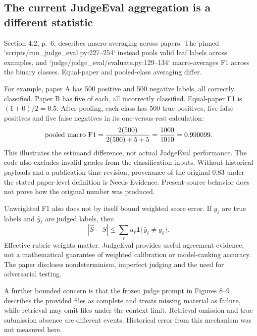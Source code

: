 \documentclass[10pt]{article}
\begin{document}
\subsection*{The current JudgeEval aggregation is a different statistic}
Section 4.2, p. 6, describes macro-averaging across papers. The pinned `scripts/run\_judge\_eval.py:227--254` instead pools valid leaf labels across examples, and `judge/judge\_eval/evaluate.py:129--134` macro-averages F1 across the binary classes. Equal-paper and pooled-class averaging differ.\par
For example, paper A has 500 positive and 500 negative labels, all correctly classified. Paper B has five of each, all incorrectly classified. Equal-paper F1 is \((1+0)/2=0.5\). After pooling, each class has 500 true positives, five false positives and five false negatives in its one-versus-rest calculation: \[{\rm pooled\ macro\ F1}=\frac{2(500)}{2(500)+5+5}
 =\frac{1000}{1010}=0.990099.\] This illustrates the estimand difference, not actual JudgeEval performance. The code also excludes invalid grades from the classification inputs. Without historical payloads and a publication-time revision, provenance of the original \(0.83\) under the stated paper-level definition is Needs Evidence. Present-source behavior does not prove how the original number was produced.\par
Unweighted F1 also does not by itself bound weighted score error. If \(y_\ell\) are true labels and \(\widehat y_\ell\) are judged labels, then \[|\widehat S-S|
 \le \sum_\ell a_\ell\mathbf1\{\widehat y_\ell\ne y_\ell\}.\] Effective rubric weights matter. JudgeEval provides useful agreement evidence, not a mathematical guarantee of weighted calibration or model-ranking accuracy. The paper discloses nondeterminism, imperfect judging and the need for adversarial testing.\par
A further bounded concern is that the frozen judge prompt in Figures 8–9 describes the provided files as complete and treats missing material as failure, while retrieval may omit files under the context limit. Retrieval omission and true submission absence are different events. Historical error from this mechanism was not measured here.\par
\end{document}
